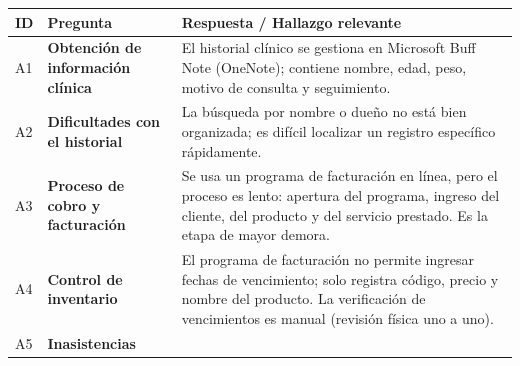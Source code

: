 \documentclass[
]{article}
\newcounter{none} %
\begin{document}
{\def\LTcaptype{none} %
\begin{longtable}[]{@{}
  >{\centering\arraybackslash}p{}
  >{\raggedright\arraybackslash}p{}
  >{\raggedright\arraybackslash}p{}@{}}
\toprule\noalign{}
\begin{minipage}[b]{\linewidth}\centering
\textbf{ID}
\end{minipage} & \begin{minipage}[b]{\linewidth}\centering
\textbf{Pregunta}
\end{minipage} & \begin{minipage}[b]{\linewidth}\raggedright
\textbf{Respuesta / Hallazgo relevante}
\end{minipage} \\
\midrule\noalign{}
\endhead
\bottomrule\noalign{}
\endlastfoot
A1 & \textbf{Obtención de información clínica} &
\begin{minipage}[t]{\linewidth}\raggedright
El historial clínico se gestiona en Microsoft Buff Note (OneNote);
contiene nombre, edad, peso, motivo de consulta y seguimiento.
\end{minipage} \\
A2 & \textbf{Dificultades con el historial} &
\begin{minipage}[t]{\linewidth}\raggedright
La búsqueda por nombre o dueño no está bien organizada; es difícil
localizar un registro específico rápidamente.
\end{minipage} \\
A3 & \textbf{Proceso de cobro y facturación} &
\begin{minipage}[t]{\linewidth}\raggedright
Se usa un programa de facturación en línea, pero el proceso es lento:
apertura del programa, ingreso del cliente, del producto y del servicio
prestado. Es la etapa de mayor demora.
\end{minipage} \\
A4 & \textbf{Control de inventario} &
\begin{minipage}[t]{\linewidth}\raggedright
El programa de facturación no permite ingresar fechas de vencimiento;
solo registra código, precio y nombre del producto. La verificación de
vencimientos es manual (revisión física uno a uno).
\end{minipage} \\
A5 & \textbf{Inasistencias} &
\begin{minipage}[t]{\linewidth}\raggedright

\end{minipage}
\end{longtable}}
\end{document}
